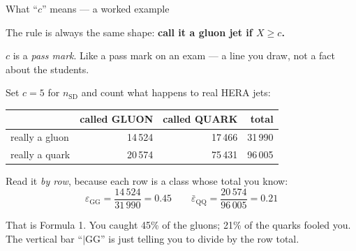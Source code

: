 \documentclass[aspectratio=169,10pt]{beamer}
\begin{document}
\begin{frame}{What ``$c$'' means --- a worked example}

The rule is always the same shape: \textbf{call it a gluon jet if $X \ge c$.}

\vspace{0.3em}
$c$ is a \emph{pass mark}. Like a pass mark on an exam --- a line you draw,
not a fact about the students.

\vspace{1em}
Set $c = 5$ for $n_{\mathrm{SD}}$ and count what happens to real HERA jets:

\vspace{0.6em}
\centering
\begin{tabular}{lrrr}
\toprule
 & called GLUON & called QUARK & total \\
\midrule
really a gluon & 14\,524 & 17\,466 & 31\,990 \\
really a quark & 20\,574 & 75\,431 & 96\,005 \\
\bottomrule
\end{tabular}

\vspace{1em}
\flushleft
Read it \emph{by row}, because each row is a class whose total you know:
\[
\varepsilon_{\mathrm{GG}} = \frac{14\,524}{31\,990} = 0.45
\qquad
\bar{\varepsilon}_{\mathrm{QQ}} = \frac{20\,574}{96\,005} = 0.21
\]

\footnotesize
That is Formula 1. You caught 45\% of the gluons; 21\% of the quarks fooled
you. The vertical bar ``$\mid\mathrm{GG}$'' is just telling you to divide by
the row total.

\end{frame}
\end{document}
